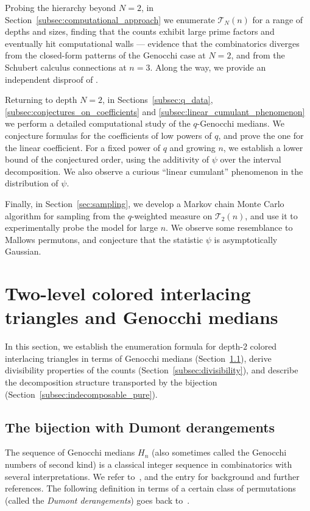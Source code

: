 \documentclass[pdftex]{sigma}
\numberwithin{equation}{section}
\theoremstyle{definition}
\begin{document}
Probing the hierarchy beyond $N=2$, in Section~\ref{subsec:computational_approach} we enumerate $\mathcal{T}_N(n)$ for a range of depths and sizes, finding that the counts exhibit large prime factors and eventually hit computational walls --- evidence that the combinatorics diverges from the closed-form patterns of the Genocchi case at $N=2$, and from the Schubert calculus connections at $n=3$.  Along the way, we provide an independent disproof of \cite[Conjecture~A.5]{ABW2023coloured_LLT}.

Returning to depth $N=2$, in Sections~\ref{subsec:q_data}, \ref{subsec:conjectures_on_coefficients} and \ref{subsec:linear_cumulant_phenomenon} we perform a detailed computational study of the $q$-Genocchi medians.  We conjecture formulas for the coefficients of low powers of $q$, and prove the one for the linear coefficient.  For a fixed power of $q$ and growing $n$, we establish a lower bound of the conjectured order, using the additivity of $\psi$ over the interval decomposition.  We also observe a curious ``linear cumulant'' phenomenon in the distribution of $\psi$.

Finally, in Section~\ref{sec:sampling}, we develop a Markov chain Monte Carlo algorithm
for sampling from the $q$-weighted measure on $\mathcal{T}_2(n)$, and use it to
experimentally probe the model for large $n$.
We observe some resemblance to Mallows permutons, and conjecture that the
statistic $\psi$ is asymptotically Gaussian.

\section{Two-level colored interlacing triangles and Genocchi medians}
\label{sec:genocchi_case}

In this section, we establish the enumeration formula for depth-$2$ colored
interlacing triangles in terms of Genocchi medians
(Section~\ref{subsec:dumont_bijection}), derive divisibility properties of the
counts (Section~\ref{subsec:divisibility}), and describe the decomposition
structure transported by the bijection
(Section~\ref{subsec:indecomposable_pure}).

\subsection{The bijection with Dumont derangements}
\label{subsec:dumont_bijection}

The sequence of Genocchi medians $H_n$ (also sometimes called the Genocchi
numbers of second kind) is a classical integer sequence in combinatorics with
several interpretations.
We refer to~\mbox{\cite{Dumont1974,DumontRandrianarivony1994}}, and the entry
\cite[A005439]{OEIS} for background and further references.
The following definition in terms of a certain class of permutations (called the
\emph{Dumont derangements}) goes back to~\cite{Dumont1974}.
\end{document}
